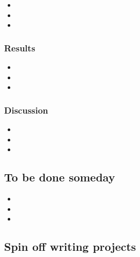 \documentclass[10pt,letterpaper]{article}
\newcommand{\bi}{\begin{itemize}}
\newcommand{\ei}{\end{itemize}}
\begin{document}
\bi
    \item  
    \item  
    \item  
\ei

\subsubsection{Results}
\label{ssubsec:new-ideas:Results}

\bi
    \item  
    \item  
    \item  
\ei

\subsubsection{Discussion}
\label{ssubsec:new-ideas:Discussion}

\bi
    \item  
    \item  
    \item  
\ei

\subsection{To be done someday}
\label{subsec:someday}



\bi
    \item  
    \item  
    \item  
\ei

\subsection{Spin off writing projects}
\label{subsec:spinoffs}


\begin{description}
    \item [ ]
    \item [ ]
    \item [ ]
    \item [ ]
\end{description}
\end{document}
